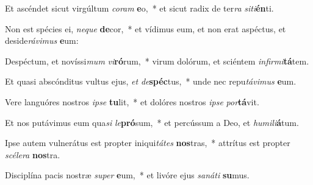 \item Et ascéndet sicut virgúltum \textit{co}\textit{ram} \textbf{e}o,~* et sicut radix de ter\textit{ra} \textit{si}\textit{ti}\textbf{én}ti.
\item Non est spécies ei, \textit{ne}\textit{que} \textbf{de}cor,~* et vídimus eum, et non erat aspéctus, et deside\textit{rá}\textit{vi}\textit{mus} \textbf{e}um:
\item Despéctum, et novíssi\textit{mum} \textit{vi}\textbf{ró}rum,~* virum dolórum, et sciéntem \textit{in}\textit{fir}\textit{mi}\textbf{tá}tem.
\item Et quasi abscónditus vultus ejus, \textit{et} \textit{de}\textbf{spéc}tus,~* unde nec repu\textit{tá}\textit{vi}\textit{mus} \textbf{e}um.
\item Vere languóres nostros \textit{ip}\textit{se} \textbf{tu}lit,~* et dolóres nostros \textit{ip}\textit{se} \textit{por}\textbf{tá}vit.
\item Et nos putávimus eum qua\textit{si} \textit{le}\textbf{pró}sum,~* et percússum a Deo, et \textit{hu}\textit{mi}\textit{li}\textbf{á}tum.
\item Ipse autem vulnerátus est propter iniqui\textit{tá}\textit{tes} \textbf{nos}tras,~* attrítus est propter \textit{scé}\textit{le}\textit{ra} \textbf{nos}tra.
\item Disciplína pacis nostræ \textit{su}\textit{per} \textbf{e}um,~* et livóre ejus \textit{sa}\textit{ná}\textit{ti} \textbf{su}mus.
